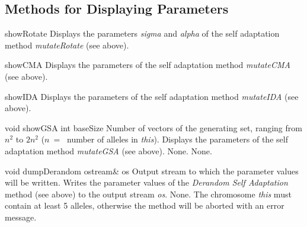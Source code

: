 \subsection{Methods for Displaying Parameters}

\setNormalInstance
\printEmptyMethod
{showRotate}
{Displays the parameters {\em sigma} and {\em alpha} of the self adaptation
 method {\em mutateRotate} (see above).}

\vspace*{4ex}

\setNormalInstance
\printEmptyMethod
{showCMA}
{Displays the parameters of the self adaptation
 method {\em mutateCMA} (see above).}

\clearpage

\setNormalInstance
\printEmptyMethod
{showIDA}
{Displays the parameters of the self adaptation
 method {\em mutateIDA} (see above).}

\vspace*{4ex}

\setNormalInstance
\printMethodWithOneParam
{void}
{showGSA}
{int}
{baseSize}
{Number of vectors of the generating set, ranging from $n^2$ to 
 $2n^2$ ($n\ =\ $ number of alleles in {\em this}).}
{Displays the parameters of the self adaptation
 method {\em mutateGSA} (see above).}
{None.}
{None.}

\vspace*{4ex}

\setConstInstance
\printMethodWithOneParam
{void}
{dumpDerandom}
{ostream\&}
{os}
{Output stream to which the parameter values will be written.}
{Writes the parameter values of the {\em Derandom Self Adaptation} method
 (see above) to the output stream {\em os}.}
{None.}
{The chromosome {\em this} must contain at least 5 alleles, otherwise
 the method will be aborted with an error message.}






